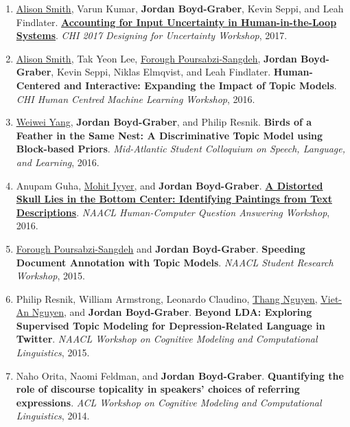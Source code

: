 {\begin{enumerate}
	 \item \underline{\href{http://alisonmsmith.github.io/}{Alison Smith}}, Varun Kumar, {\bf Jordan Boyd-Graber}, Kevin Seppi, and Leah Findlater.  {\bf \href{http://visualization.ischool.uw.edu/hci_uncertainty/papers/Paper11.pdf}{Accounting for Input Uncertainty in Human-in-the-Loop Systems}}.  \emph{CHI 2017 Designing for Uncertainty Workshop}, 2017.

	 \item \underline{\href{http://alisonmsmith.github.io/}{Alison Smith}}, Tak Yeon Lee, \underline{\href{https://www.microsoft.com/en-us/research/people/fpoursabzi/projects/}{Forough Poursabzi-Sangdeh}}, {\bf Jordan Boyd-Graber}, Kevin Seppi, Niklas Elmqvist, and Leah Findlater.  {\bf Human-Centered and Interactive: Expanding the Impact of Topic Models}.  \emph{CHI Human Centred Machine Learning Workshop}, 2016.

	 \item \underline{\href{https://ywwbill.github.io/}{Weiwei Yang}}, {\bf Jordan Boyd-Graber}, and Philip Resnik.  {\bf Birds of a Feather in the Same Nest: A Discriminative Topic Model using Block-based Priors}.  \emph{Mid-Atlantic Student Colloquium on Speech, Language, and Learning}, 2016.

	 \item Anupam Guha, \underline{\href{https://people.cs.umass.edu/~miyyer/}{Mohit Iyyer}}, and {\bf Jordan Boyd-Graber}.  {\bf \href{http://cs.umd.edu/~jbg//docs/2016_naacl_paintings.pdf}{A Distorted Skull Lies in the Bottom Center: Identifying Paintings from Text Descriptions}}.  \emph{NAACL Human-Computer Question Answering Workshop}, 2016.

	 \item \underline{\href{https://www.microsoft.com/en-us/research/people/fpoursabzi/projects/}{Forough Poursabzi-Sangdeh}} and {\bf Jordan Boyd-Graber}.  {\bf Speeding Document Annotation with Topic Models}.  \emph{NAACL Student Research Workshop}, 2015.

	 \item Philip Resnik, William Armstrong, Leonardo Claudino, \underline{\href{https://www.linkedin.com/in/thang-nguyen-a4a04922}{Thang Nguyen}}, \underline{\href{https://viet-an.github.io/}{Viet-An Nguyen}}, and {\bf Jordan Boyd-Graber}.  {\bf Beyond {LDA}: Exploring Supervised Topic Modeling for Depression-Related Language in Twitter}.  \emph{NAACL Workshop on Cognitive Modeling and Computational Linguistics}, 2015.

	 \item Naho Orita, Naomi Feldman, and {\bf Jordan Boyd-Graber}.  {\bf Quantifying the role of discourse topicality in  speakers' choices of referring expressions}.  \emph{ACL Workshop on Cognitive Modeling and Computational Linguistics}, 2014.


\end{enumerate}}
